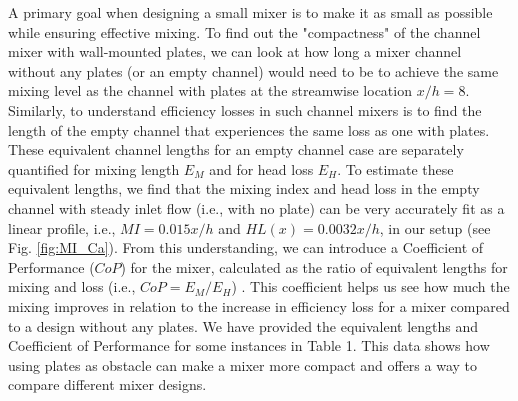 \documentclass[%
aip,
amsmath,amssymb,
reprint,
]{revtex4-1}
\begin{document}
			
			A primary goal when designing a small mixer is to make it as small as possible while ensuring effective mixing. To find out the "compactness" of the channel mixer with wall-mounted plates, we can look at how long a mixer channel without any plates (or an empty channel) would need to be to achieve the same mixing level as the channel with plates at the streamwise location $x/h = 8$. Similarly, to understand efficiency losses in such channel mixers is to find the length of the empty channel that experiences the same loss as one with plates. These equivalent channel lengths for an empty channel case are separately quantified for mixing length $E_M$ and for head loss $E_H$. To estimate these equivalent lengths, we find that the mixing index and head loss in the empty channel with steady inlet flow (i.e., with no plate) can be very accurately fit as a linear profile, i.e., $MI = 0.015x/h$ and $HL(x)=0.0032x/h$, in our setup (see Fig. \ref{fig:MI_Ca}). From this understanding, we can introduce a Coefficient of Performance ($CoP$) for the mixer, calculated as the ratio of equivalent lengths for mixing and loss (i.e., $CoP = E_M/E_H$) \cite{Aaron2019}. This coefficient helps us see how much the mixing improves in relation to the increase in efficiency loss for a mixer compared to a design without any plates. We have provided the equivalent lengths and Coefficient of Performance for some instances in Table 1. This data shows how using plates as obstacle can make a mixer more compact and offers a way to compare different mixer designs.
\end{document}
